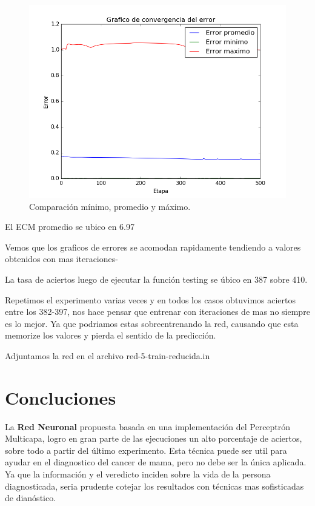 \documentclass[onecolumn,10pt]{article}
\begin{document}
\begin{figure}[H]
  \centering
  \includegraphics[width=0.7\columnwidth]{red_5_prom_reducida.png}
  \caption{Comparación mínimo, promedio y máximo.}
  \label{fig:red promedios}
\end{figure}

El ECM promedio se ubico en 6.97

Vemos que los graficos de errores se acomodan rapidamente tendiendo a valores obtenidos
con mas iteraciones-

La tasa de aciertos luego de ejecutar la función testing se úbico en 387 sobre 410.

Repetimos el experimento varias veces y en todos los casos obtuvimos aciertos entre los
382-397, nos hace pensar que entrenar con iteraciones de mas no siempre es lo mejor.
Ya que podriamos estas sobreentrenando la red, causando que esta memorize los valores
y pierda el sentido de la predicción.

Adjuntamos la red en el archivo red-5-train-reducida.in


\section{Concluciones}

La \textbf{Red Neuronal} propuesta basada en una implementación del Perceptrón Multicapa,
logro en gran parte de las ejecuciones un alto porcentaje de aciertos, sobre todo a 
partir del último experimento.
Esta técnica puede ser util para ayudar en el diagnostico del cancer de mama, pero
no debe ser la única aplicada. Ya que la información y el veredicto inciden
sobre la vida de la persona diagnosticada, seria prudente cotejar los resultados
con técnicas mas sofisticadas de dianóstico.


\newpage
\end{document}
